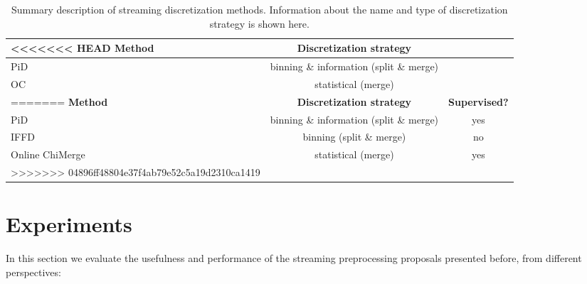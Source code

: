 \documentclass[preprint,12pt]{elsarticle}
\begin{document}
\begin{itemize}
\begin{table}[!htp]
\renewcommand{\arraystretch}{1.3}
\centering
\scriptsize
\caption{Summary description of streaming discretization methods. Information about the name and type of discretization strategy is shown here.}
\label{tab:disc}
\begin{tabular}{lcc}
\toprule
<<<<<<< HEAD
{\bf Method} & {\bf Discretization strategy}\\
\midrule
PiD~\cite{gama06} & binning \& information (split \& merge)\\
OC~\cite{lehti12} &  statistical (merge)\\
=======
{\bf Method} & {\bf Discretization strategy} & {\bf Supervised?}\\
\midrule
PiD~\cite{gama06} & binning \& information (split \& merge) & yes\\
IFFD~\cite{lu06} & binning (split \& merge) & no \\
Online ChiMerge~\cite{lehti12} &  statistical (merge) & yes\\
>>>>>>> 04896ff48804e37f4ab79e52c5a19d2310ca1419
\bottomrule
\end{tabular}
\end{table}


\section{Experiments}
\label{sec:exp}

In this section we evaluate the usefulness and performance of the streaming preprocessing proposals presented before, from different perspectives:


\end{itemize}
\end{document}
